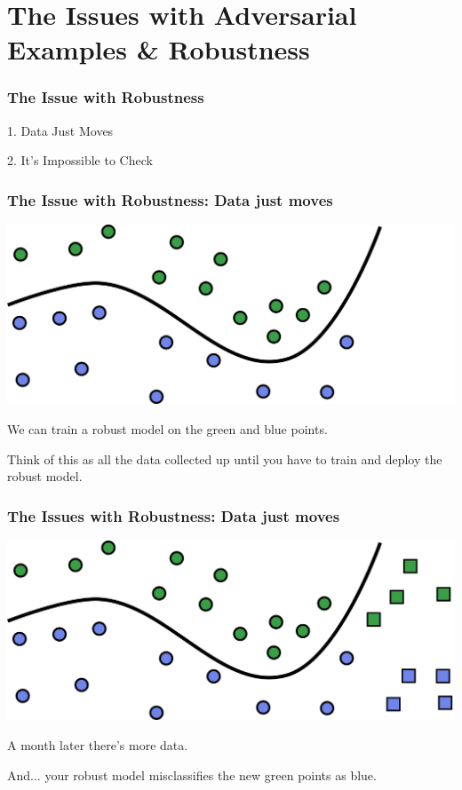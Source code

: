 \documentclass{beamer}
\begin{document}
\section{The Issues with Adversarial Examples \& Robustness}

\begin{frame}
    \frametitle{The Issue with Robustness}
    \begin{center}
        1. Data Just Moves

        \vspace*{30pt}
        2. It's Impossible to Check
    \end{center}
\end{frame}


\begin{frame}
    \frametitle{The Issue with Robustness: Data just moves}
    \begin{center}
        \includegraphics[scale=1.2]{training_1.png}

        We can train a robust model on the green and blue points. 

        \vspace*{20pt}
        Think of this as all the data collected up until you have to train and deploy the robust model.
    \end{center}
\end{frame}

\begin{frame}
    \frametitle{The Issues with Robustness: Data just moves}
    \begin{center}
        \includegraphics[scale=1.2]{training_2.png}

        A month later there's more data. 
        
        \vspace*{20pt}
        And... your robust model misclassifies the new green points as blue. 
    \end{center}
\end{frame}
\end{document}
